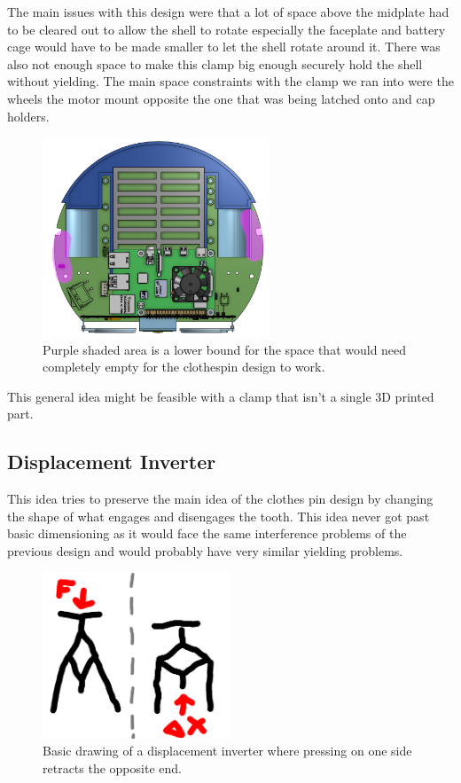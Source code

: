 \documentclass{iopart}
\begin{document}
The main issues with this design were that a lot of space above the midplate had to be cleared out to allow the shell to rotate especially the faceplate and battery cage would have to be made smaller to let the shell rotate around it. There was also not enough space to make this clamp big enough securely hold the shell without yielding. The main space constraints with the clamp we ran into were the wheels the motor mount opposite the one that was being latched onto and cap holders.

\begin{figure}[h!]
    \centering
    \includegraphics[width=0.6\textwidth]{graphics/clothespin_midplate_clearance.png}\\
    Purple shaded area is a lower bound for the space that would need completely empty for the clothespin design to work.
\end{figure}

This general idea might be feasible with a clamp that isn't a single 3D printed part.

\subsection{Displacement Inverter}

This idea tries to preserve the main idea of the clothes pin design by changing the shape of what engages and disengages the tooth. This idea never got past basic dimensioning as it would face the same interference problems of the previous design and would probably have very similar yielding problems.

\begin{figure}[h!]
    \centering
    \includegraphics[width=0.5\textwidth]{graphics/displacement_inverter.png}\\
    Basic drawing of a displacement inverter where pressing on one side retracts the opposite end.
\end{figure}
\end{document}
